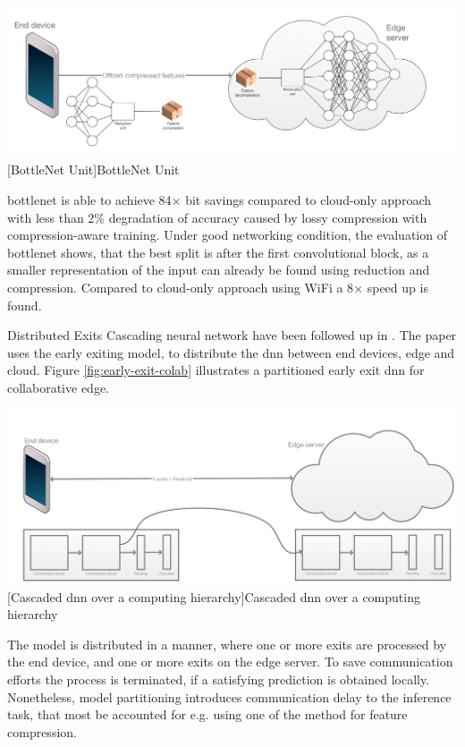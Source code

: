 \begin{enumdescript}
	\begin{minipage}[t]{\linewidth}
		\centering
		\includegraphics[width=.8\linewidth]{figures/models/bottlenet}
		[BottleNet Unit]{BottleNet Unit}
	\end{minipage}

	\gls{bottlenet} is able to achieve 84$\times$ bit savings compared to cloud-only approach with less than 2\% degradation of accuracy caused by lossy compression with compression-aware training. Under good networking condition, the evaluation of \gls{bottlenet} shows, that the best split is after the first convolutional block, as a smaller representation of the input can already be found using reduction and compression. Compared to cloud-only approach using WiFi a 8$\times$ speed up is found. 
	
	\item[Distributed Exits] Cascading neural network have been followed up in \cite{leroux_cascading_2017}. The paper uses the early exiting model, to distribute the \gls{dnn} between end devices, edge and cloud. Figure \ref{fig:early-exit-colab} illustrates a partitioned early exit \gls{dnn} for collaborative edge. 
	
	\begin{minipage}[t]{\linewidth}
		\centering
		\includegraphics[width=\linewidth]{figures/models/cascaded}
		[Cascaded \gls{dnn} over a computing hierarchy]{Cascaded \gls{dnn} over a computing hierarchy}
		\label{fig:early-exit-colab}
	\end{minipage}
	The model is distributed in a manner, where one or more exits are processed by the end device, and one or more exits on the edge server. To save communication efforts the process is terminated, if a satisfying prediction is obtained locally. Nonetheless, model partitioning introduces communication delay to the inference task, that most be accounted for e.g. using one of the method for feature compression.
	

\end{enumdescript}
